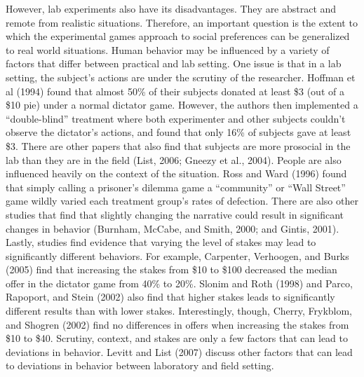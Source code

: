 \documentclass{article}
\begin{document}
However, lab experiments also have its disadvantages. They are abstract and remote from realistic situations. Therefore, an important question is the extent to which the experimental games approach to social preferences can be generalized to real world situations. Human behavior may be influenced by a variety of factors that differ between practical and lab setting. One issue is that in a lab setting, the subject's actions are under the scrutiny of the researcher. Hoffman et al (1994) found that almost 50\% of their subjects donated at least \$3 (out of a \$10 pie) under a normal dictator game. However, the authors then implemented a ``double-blind'' treatment where both experimenter and other subjects couldn\rq t observe the dictator\rq s actions, and found that only 16\% of subjects gave at least \$3. There are other papers that also find that subjects are more prosocial in the lab than they are in the field (List, 2006; Gneezy et al., 2004). People are also influenced heavily on the context of the situation. Ross and Ward (1996) found that simply calling a prisoner's dilemma game a ``community'' or ``Wall Street'' game wildly varied each treatment group\rq s rates of defection. There are also other studies that find that slightly changing the narrative could result in significant changes in behavior (Burnham, McCabe, and Smith, 2000; and Gintis, 2001). Lastly, studies find evidence that varying the level of stakes may lead to significantly different behaviors. For example, Carpenter, Verhoogen, and Burks (2005) find that increasing the stakes from \$10 to \$100 decreased the median offer in the dictator game from 40\% to 20\%. Slonim and Roth (1998) and Parco, Rapoport, and Stein (2002) also find that higher stakes leads to significantly different results than with lower stakes. Interestingly, though, Cherry, Frykblom, and Shogren (2002) find no differences in offers when increasing the stakes from \$10 to \$40. Scrutiny, context, and stakes are only a few factors that can lead to deviations in behavior. Levitt and List (2007) discuss other factors that can lead to deviations in behavior between laboratory and field setting. 
 
\end{document}
